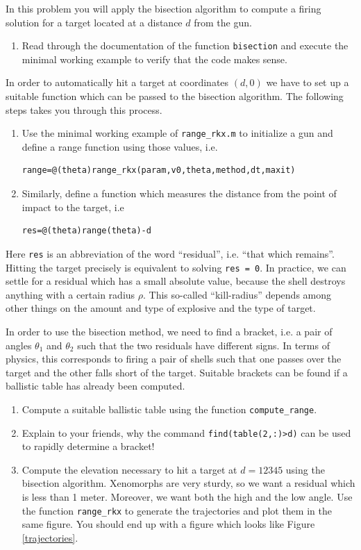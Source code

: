 \documentclass[a4paper,12pt]{article}
\newcounter{problem}
\newenvironment{problem}{\refstepcounter{problem} \noindent {\bf Problem \arabic{problem}}}{\newpage}
\begin{document}
\begin{problem} In this problem you will apply the bisection algorithm to compute a firing solution for a target located at a distance $d$ from the gun.
\begin{enumerate}
\item Read through the documentation of the function {\tt bisection} and execute the minimal working example to verify that the code makes sense. 
\end{enumerate}
In order to automatically hit a target at coordinates $(d,0)$ we have to set up a suitable function which can be passed to the bisection algorithm. The following steps takes you through this process.
\begin{enumerate}[resume]
\item Use the minimal working example of {\tt range\_rkx.m} to initialize a gun and define a range function using those values, i.e.
\begin{verbatim}
range=@(theta)range_rkx(param,v0,theta,method,dt,maxit)
\end{verbatim}
\item Similarly, define a function which measures the distance from the point of impact to the target, i.e
\begin{verbatim}
res=@(theta)range(theta)-d
\end{verbatim} 
\end{enumerate} 
Here {\tt res} is an abbreviation of the word ``residual'', i.e. ``that which remains''. Hitting the target precisely is equivalent to solving {\tt res = 0}. In practice, we can settle for a residual which has a small absolute value, because the shell destroys anything with a certain radius $\rho$. This so-called ``kill-radius'' depends among other things on the amount and type of explosive and the type of target.

In order to use the bisection method, we need to find a bracket, i.e. a pair of angles $\theta_1$ and $\theta_2$ such that the two residuals have different signs. In terms of physics, this corresponds to firing a pair of shells such that one passes over the target and the other falls short of the target. Suitable brackets can be found if a ballistic table has already been computed.
\begin{enumerate}[resume]
\item Compute a suitable ballistic table using the function {\tt compute\_range}.
\item Explain to your friends, why the command {\tt find(table(2,:)>d)} can be used to rapidly determine a bracket!
\item Compute the elevation necessary to hit a target at $d = 12345$ using the bisection algorithm. Xenomorphs are very sturdy, so we want a residual which is less than 1 meter. Moreover, we want both the high and the low angle. Use the function {\tt range\_rkx} to generate the trajectories and plot them in the same figure. You should end up with a figure which looks like Figure \ref{trajectories}.


\end{enumerate}
\end{problem}
\end{document}
